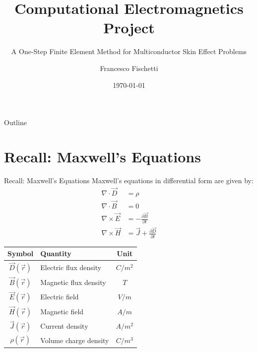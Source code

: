 \documentclass[aspectratio=54,xcolor=dvipsnames]{beamer}
\title{Computational Electromagnetics Project}
\subtitle{A One-Step Finite Element Method for Multiconductor Skin Effect Problems}
\author{Francesco Fischetti}
\institute{Politecnico di Milano}
\date{\today}
\begin{document}
\begin{frame}
    \titlepage
\end{frame}

\begin{frame}{Outline}
    \tableofcontents
\end{frame}


\section{Recall: Maxwell's Equations}
\begin{frame}{Recall: Maxwell's Equations}
    Maxwell's equations in differential form are given by:
    \begin{align*}
        \nabla \cdot \vec{D} &= \rho \\
        \nabla \cdot \vec{B} &= 0 \\
        \nabla \times \vec{E} &= -\frac{\partial \vec{B}}{\partial t} \\
        \nabla \times \vec{H} &= \vec{J} + \frac{\partial \vec{D}}{\partial t}
    \end{align*}

    \begin{center}
    \begin{tabular}{|c|l|c|}
        \hline
        Symbol & Quantity & Unit \\
        \hline
        $\vec{D}(\vec{r})$ & Electric flux density & $C/m^2$ \\
        $\vec{B}(\vec{r})$ & Magnetic flux density & $T$ \\
        $\vec{E}(\vec{r})$ & Electric field & $V/m$ \\
        $\vec{H}(\vec{r})$ & Magnetic field & $A/m$ \\
        $\vec{J}(\vec{r})$ & Current density & $A/m^2$ \\
        $\rho(\vec{r})$ & Volume charge density & $C/m^3$ \\
        \hline
    \end{tabular}
    \end{center}
\end{frame}
\end{document}

